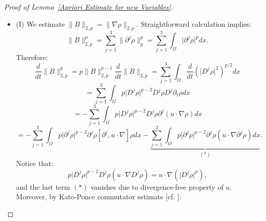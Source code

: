 \documentclass[12pt,letterpaper]{article}
\theoremstyle{plain}
\begin{document}
\begin{proof}[Proof of Lemma~\ref{Apriori Estimate for new Variables}]
\begin{itemize}
We first remark that the proof works as long as $\lVert\rho_0\rVert_{4,p}$ is bounded, here we set a bound to remove the dependence of constants $C$ in $\lVert\rho_0\rVert_{4,p}$. However, although we have $u_0, B_0\in W^{3,p}$, the smallness assumption is really at the level of natural local well-posedness regularity class of MHD.

    \item [] 
    
    (I) We estimate $\lVert B\rVert_{2,p}=\lVert \nabla\rho\rVert_{2,p}$. Straightforward calculation implies:
    \begin{equation*}
      \lVert B\rVert_{2,p}^p=\sum_{j=1}^3\lVert \partial^j\rho\rVert_p^p=\sum_{j=1}^3\int_\Omega \lvert \partial^j \rho\rvert^p dx   . \end{equation*}
    Therefore:
    \begin{equation*}
     \frac{d}{dt} \lVert B\rVert_{2,p}^p=p\lVert B\rVert_{2,p}^{p-1}\frac{d}{dt} \lVert B\rVert_{2,p}=\sum_{j=1}^3\int_\Omega\frac{d}{dt} (\lvert D^j \rho\rvert^2)^{p/2} dx    
    \end{equation*}
    \begin{equation*}
     = \sum_{j=1}^3\int_\Omega p\lvert D^j \rho\rvert^{p-2}D^j\rho  D^j\partial_t \rho dx  
    \end{equation*}
    \begin{equation*}
     = -\sum_{j=1}^3\int_\Omega p\lvert D^j \rho\rvert^{p-2}D^j\rho  \partial^j(u\cdot\nabla \rho) dx  
    \end{equation*}
    \begin{equation*}
       = -\sum_{j=1}^3\int_\Omega p\lvert \partial^j \rho\rvert^{p-2}\partial^j\rho  [\partial^j,u\cdot\nabla] \rho dx -\underbrace{\sum_{j=1}^3\int_\Omega p\lvert \partial^j \rho\rvert^{p-2}\partial^j\rho  (u\cdot\nabla \partial^j \rho)dx}_{(*)}. 
    \end{equation*}
    Notice that:
    \begin{equation*}
    p\lvert D^j \rho\rvert^{p-2}D^j\rho  (u\cdot\nabla D^j \rho)=u\cdot\nabla(\lvert D^j\rho\rvert^p),    
    \end{equation*}
    and the last term $(*)$ vanishes due to divergence-free property of $u$. Moreover, by Kato-Ponce commutator estimate [cf. \cite{KatoPonce1988}\cite{Li2019}]:
    \begin{equation}\label{Kato-Ponce Commutator}

\end{equation}
\end{itemize}
\end{proof}
\end{document}
